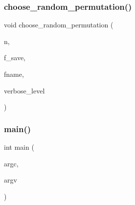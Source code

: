 \subsubsection{\texorpdfstring{choose\+\_\+random\+\_\+permutation()}{choose\_random\_permutation()}}
{\footnotesize\ttfamily void choose\+\_\+random\+\_\+permutation (\begin{DoxyParamCaption}\item[{\mbox{\hyperlink{galois_8h_a09fddde158a3a20bd2dcadb609de11dc}{I\+NT}}}]{n,  }\item[{\mbox{\hyperlink{galois_8h_a09fddde158a3a20bd2dcadb609de11dc}{I\+NT}}}]{f\+\_\+save,  }\item[{const \mbox{\hyperlink{galois_8h_ab6cc7b4aeb6ea31aba2b3fbfc83ff5e6}{B\+Y\+TE}} $\ast$}]{fname,  }\item[{\mbox{\hyperlink{galois_8h_a09fddde158a3a20bd2dcadb609de11dc}{I\+NT}}}]{verbose\+\_\+level }\end{DoxyParamCaption})}

\mbox{\label{random__permutation_8_c_a3c04138a5bfe5d72780bb7e82a18e627}} 
\subsubsection{\texorpdfstring{main()}{main()}}
{\footnotesize\ttfamily int main (\begin{DoxyParamCaption}\item[{int}]{argc,  }\item[{char $\ast$$\ast$}]{argv }\end{DoxyParamCaption})}

